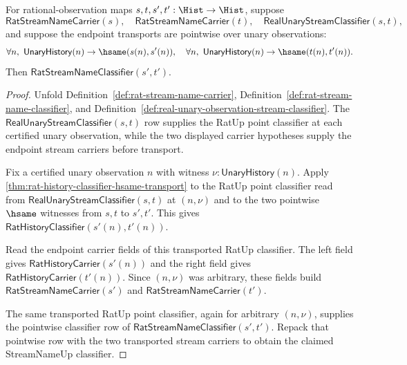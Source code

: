 \begin{theorem}
\label{thm:real-unary-streamname-transported-classifier}
For rational-observation maps $s,t,s',t':\Hist\to\Hist$, suppose
$$
\mathsf{RatStreamNameCarrier}(s),\quad
\mathsf{RatStreamNameCarrier}(t),\quad
\mathsf{RealUnaryStreamClassifier}(s,t),
$$
and suppose the endpoint transports are pointwise over unary observations:
$$
\forall n,\ \mathsf{UnaryHistory}(n)\to\hsame(s(n),s'(n)),
\quad
\forall n,\ \mathsf{UnaryHistory}(n)\to\hsame(t(n),t'(n)).
$$
Then $\mathsf{RatStreamNameClassifier}(s',t')$.
\end{theorem}
\begin{proof}
Unfold Definition~\ref{def:rat-stream-name-carrier},
Definition~\ref{def:rat-stream-name-classifier}, and
Definition~\ref{def:real-unary-observation-stream-classifier}. The
$\mathsf{RealUnaryStreamClassifier}(s,t)$ row supplies the RatUp point
classifier at each certified unary observation, while the two displayed
carrier hypotheses supply the endpoint stream carriers before transport.

Fix a certified unary observation $n$ with witness
$\nu:\mathsf{UnaryHistory}(n)$. Apply
\autoref{thm:rat-history-classifier-hsame-transport} to the RatUp point
classifier read from $\mathsf{RealUnaryStreamClassifier}(s,t)$ at $(n,\nu)$
and to the two pointwise $\hsame$ witnesses from $s,t$ to $s',t'$. This gives
$\mathsf{RatHistoryClassifier}(s'(n),t'(n))$.

Read the endpoint carrier fields of this transported RatUp classifier. The
left field gives $\mathsf{RatHistoryCarrier}(s'(n))$ and the right field gives
$\mathsf{RatHistoryCarrier}(t'(n))$. Since $(n,\nu)$ was arbitrary, these
fields build $\mathsf{RatStreamNameCarrier}(s')$ and
$\mathsf{RatStreamNameCarrier}(t')$.

The same transported RatUp point classifier, again for arbitrary $(n,\nu)$,
supplies the pointwise classifier row of
$\mathsf{RatStreamNameClassifier}(s',t')$. Repack that pointwise row with the
two transported stream carriers to obtain the claimed StreamNameUp
classifier.
\end{proof}

